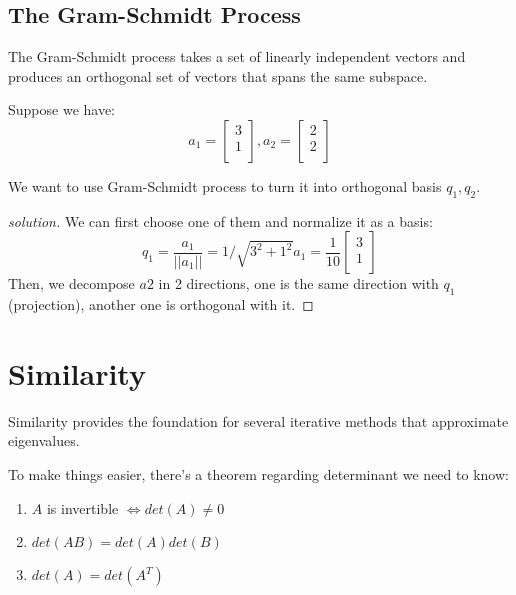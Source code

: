 \subsection{The Gram-Schmidt Process}\label{sec: gram-schmidt process}
The Gram-Schmidt process takes a set of linearly independent vectors and produces an orthogonal set of vectors that spans the same subspace.

\begin{example}
    Suppose we have:
    \[
        a_1 = \begin{bmatrix}
             3 \\
             1 \\
        \end{bmatrix},
        a_2 = \begin{bmatrix}
             2 \\
             2 \\
        \end{bmatrix}
    \]

    We want to use Gram-Schmidt process to turn it into orthogonal basis \(q_ 1, q_2\). 
\end{example}
\begin{proof}[solution]
    We can first choose one of them and normalize it as a basis:
    \[
        q_1 = \dfrac{a_1}{||a_1||} 
            = 1/\sqrt{3^2 + 1^2} a_1
            = \dfrac{1}{10} \begin{bmatrix}
                 3 \\
                 1 \\
            \end{bmatrix}
    \]
    Then, we decompose \(a2\) in 2 directions, one is the same direction with \(q_1\) (projection), another one is orthogonal with it.

\end{proof}


\section{Similarity} \label{sec: Similarity}
Similarity provides the foundation for several iterative methods that approximate eigenvalues.

To make things easier, there's a theorem regarding determinant we need to know:
\begin{theorem}
    \begin{enumerate}
        \item \(A\) is invertible \(\iff det(A) \neq 0\)
        \item \(det(AB) = det(A) det(B)\)    
        \item  \(det(A) = det(A^T)\) 
    \end{enumerate}
\end{theorem}

